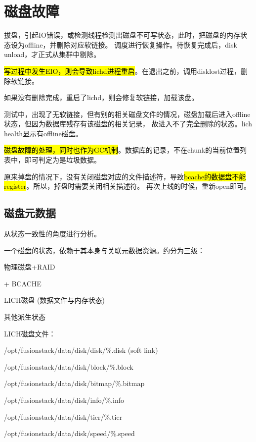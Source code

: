 \section{磁盘故障}

拔盘，引起IO错误，或检测线程检测出磁盘不可写状态，此时，把磁盘的内存状态设为offline，并删除对应软链接。
调度进行恢复操作。待恢复完成后，disk unload，才正式从集群中剔除。

\hl{写过程中发生EIO，则会导致lichd进程重启}。在退出之前，调用disklost过程，删除软链接。

如果没有删除完成，重启了lichd，则会修复软链接，加载该盘。

测试中，出现了无软链接，但有别的相关磁盘文件的情况，磁盘加载后进入offline状态，但因为数据库残存有该磁盘的相关记录，
故进入不了完全删除的状态。lich health显示有offline磁盘。

\hl{磁盘故障的处理，同时也作为GC机制}。数据库的记录，不在chunk的当前位置列表中，即可判定为是垃圾数据。

原来掉盘的情况下，没有关闭磁盘对应的文件描述符，导致\hl{bcache的数据盘不能register}。所以，掉盘时需要关闭相关描述符。
再次上线的时候，重新open即可。

\subsection{磁盘元数据}

从状态一致性的角度进行分析。

一个磁盘的状态，依赖于其本身与关联元数据资源。约分为三级：
\begin{enumbox}
\item 物理磁盘+RAID
\item + BCACHE
\item LICH磁盘 (数据文件与内存状态)
\end{enumbox}

其他派生状态

LICH磁盘文件：
\begin{enumbox}
\item /opt/fusionstack/data/disk/disk/\%.disk (soft link)
\item /opt/fusionstack/data/disk/block/\%.block
\item /opt/fusionstack/data/disk/bitmap/\%.bitmap
\item /opt/fusionstack/data/disk/info/\%.info
\item /opt/fusionstack/data/disk/tier/\%.tier
\item /opt/fusionstack/data/disk/speed/\%.speed
\end{enumbox}

